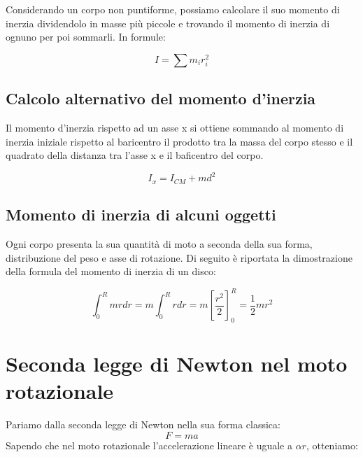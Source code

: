 \documentclass[10pt,a4paper]{article}
\begin{document}
	Considerando un corpo non puntiforme, possiamo calcolare il suo momento di inerzia dividendolo in masse più piccole e trovando il momento di inerzia di ognuno per poi sommarli. In formule:

	\begin{definition}
		\begin{equation}
			I = \sum m_i r_i^2
		\end{equation}
	\end{definition}

	\subsection{Calcolo alternativo del momento d'inerzia}

	Il momento d'inerzia rispetto ad un asse x si ottiene sommando al momento di inerzia iniziale rispetto al baricentro il prodotto tra la massa del corpo stesso e il quadrato della distanza tra l'asse x e il baficentro del corpo.

	\begin{definition}
		\begin{equation}
		I_x = I_{CM} + md^2
		\end{equation}
	\end{definition}

	\subsection{Momento di inerzia di alcuni oggetti}

	Ogni corpo presenta la sua quantità di moto a seconda della sua forma, distribuzione del peso e asse di rotazione. Di seguito è riportata la dimostrazione della formula del momento di inerzia di un disco:

	\begin{equation}
		\int_{0}^{R} mr dr = m \int_{0}^{R} r dr = m [\frac{r^2}{2}]_0^R = \frac{1}{2}mr^2
	\end{equation}

	\section{Seconda legge di Newton nel moto rotazionale}

	Pariamo dalla seconda legge di Newton nella sua forma classica:
	$$F=ma$$
Sapendo che nel moto rotazionale l'accelerazione lineare è uguale a $\alpha r$, otteniamo:
\end{document}
